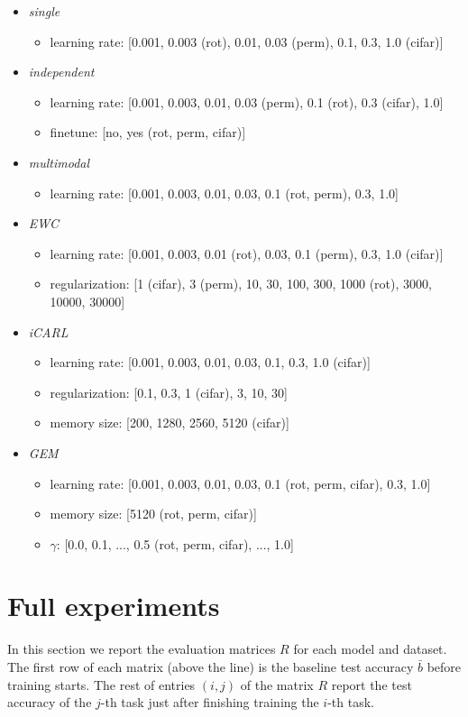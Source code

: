 \begin{itemize}
  \item \emph{single}
  \begin{itemize}
    \item learning rate: [0.001, 0.003 (rot), 0.01, 0.03 (perm), 0.1, 0.3, 1.0 (cifar)]
  \end{itemize}
  \item \emph{independent}
  \begin{itemize}
    \item learning rate: [0.001, 0.003, 0.01, 0.03 (perm), 0.1 (rot), 0.3 (cifar), 1.0]
    \item finetune: [no, yes (rot, perm, cifar)]
  \end{itemize}
  \item \emph{multimodal}
  \begin{itemize}
    \item learning rate: [0.001, 0.003, 0.01, 0.03, 0.1 (rot, perm), 0.3, 1.0]
  \end{itemize}
  \item \emph{EWC}
  \begin{itemize}
    \item learning rate: [0.001, 0.003, 0.01 (rot), 0.03, 0.1 (perm), 0.3, 1.0 (cifar)]
    \item regularization: [1 (cifar), 3 (perm), 10, 30, 100, 300, 1000 (rot), 3000, 10000, 30000]
  \end{itemize}
  \item \emph{iCARL}
  \begin{itemize}
    \item learning rate: [0.001, 0.003, 0.01, 0.03, 0.1, 0.3, 1.0 (cifar)]
    \item regularization: [0.1, 0.3, 1 (cifar), 3, 10, 30]
    \item memory size:    [200, 1280, 2560, 5120 (cifar)] 
  \end{itemize}
  \item \emph{GEM}
  \begin{itemize}
    \item learning rate: [0.001, 0.003, 0.01, 0.03, 0.1 (rot, perm, cifar), 0.3, 1.0]
    \item memory size: [5120 (rot, perm, cifar)]
    \item $\gamma$: [0.0, 0.1, ..., 0.5 (rot, perm, cifar), ..., 1.0]
  \end{itemize}
\end{itemize}

\clearpage
\newpage
\section{Full experiments} \label{sec:app-r}
In this section we report the evaluation matrices $R$ for each model and
dataset.  The first row of each matrix (above the line) is the baseline test
accuracy $\bar{b}$ before training starts. The rest of entries $(i,j)$ of the
matrix $R$ report the test accuracy of the $j$-th task just after finishing
training the $i$-th task.

